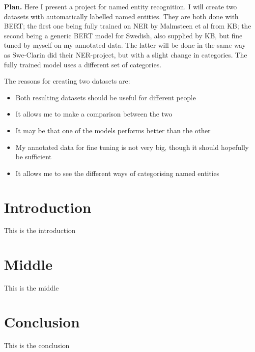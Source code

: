 \UseRawInputEncoding


\textbf{Plan.} Here I present a project for named entity recognition. I will create two datasets with automatically labelled named entities. They are both done with BERT; the first one being fully trained on NER by Malmsteen et al from KB; the second being a generic BERT model for Swedish, also supplied by KB, but fine tuned by myself on my annotated data. The latter will be done in the same way as Swe-Clarin did their NER-project, but with a slight change in categories. The fully trained model uses a different set of categories.

The reasons for creating two datasets are:

\begin{itemize}
    \item Both resulting datasets should be useful for different people
    \item It allows me to make a comparison between the two
    \item It may be that one of the models performs better than the other
    \item My annotated data for fine tuning is not very big, though it should hopefully be sufficient
    \item It allows me to see the different ways of categorising named entities
\end{itemize}

\section{Introduction}

This is the introduction

\section{Middle}

This is the middle

\section{Conclusion}

This is the conclusion